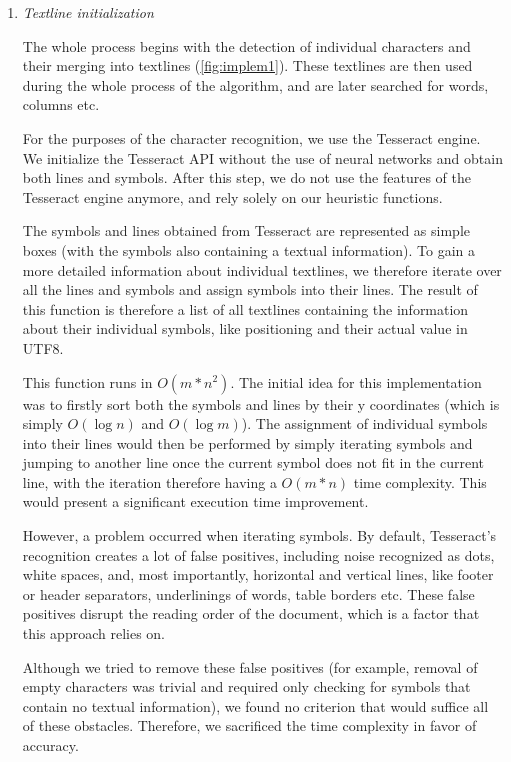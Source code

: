 \begin{enumerate}
\item \emph{Textline initialization}

The whole process begins with the detection of individual characters and their merging into textlines (\cref{fig:implem1}). These textlines are then used during the whole process of the algorithm, and are later searched for words, columns etc.

For the purposes of the character recognition, we use the Tesseract engine. We initialize the Tesseract API without the use of neural networks and obtain both lines and symbols. After this step, we do not use the features of the Tesseract engine anymore, and rely solely on our heuristic functions.

The symbols and lines obtained from Tesseract are represented as simple boxes (with the symbols also containing a textual information). To gain a more detailed information about individual textlines, we therefore iterate over all the lines and symbols and assign symbols into their lines. The result of this function is therefore a list of all textlines containing the information about their individual symbols, like positioning and their actual value in UTF8.

This function runs in $O(m*n^2)$. The initial idea for this implementation was to firstly sort both the symbols and lines by their y coordinates (which is simply $O(\log n)$ and  $O(\log m)$). The assignment of individual symbols into their lines would then be performed by simply iterating symbols and jumping to another line once the current symbol does not fit in the current line, with the iteration therefore having a $O(m*n)$ time complexity. This would present a significant execution time improvement.

However, a problem occurred when iterating symbols. By default, Tesseract's recognition creates a lot of false positives, including noise recognized as dots, white spaces, and, most importantly, horizontal and vertical lines, like footer or header separators, underlinings of words, table borders etc. These false positives disrupt the reading order of the document, which is a factor that this approach relies on.

Although we tried to remove these false positives (for example, removal of empty characters was trivial and required only checking for symbols that contain no textual information), we found no criterion that would suffice all of these obstacles. Therefore, we sacrificed the time complexity in favor of accuracy.


\end{enumerate}

